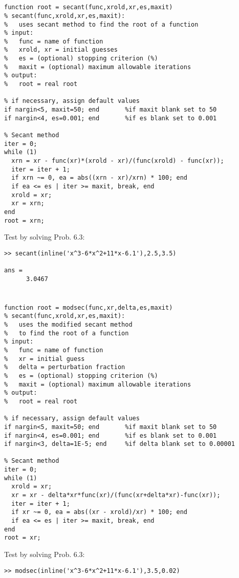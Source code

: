 \documentclass[../main.tex]{subfiles}
\begin{document}
\begin{enumerate}[label=\bfseries(\alph*)]
\section{}
\begin{lstlisting}[numbers=none]
function root = secant(func,xrold,xr,es,maxit)
% secant(func,xrold,xr,es,maxit):
%   uses secant method to find the root of a function
% input:
%   func = name of function
%   xrold, xr = initial guesses
%   es = (optional) stopping criterion (%)
%   maxit = (optional) maximum allowable iterations
% output:
%   root = real root

% if necessary, assign default values
if nargin<5, maxit=50; end 		 %if maxit blank set to 50
if nargin<4, es=0.001; end 		 %if es blank set to 0.001

% Secant method
iter = 0;
while (1)
  xrn = xr - func(xr)*(xrold - xr)/(func(xrold) - func(xr));
  iter = iter + 1;
  if xrn ~= 0, ea = abs((xrn - xr)/xrn) * 100; end
  if ea <= es | iter >= maxit, break, end
  xrold = xr;
  xr = xrn;
end
root = xrn;
\end{lstlisting}
\bigbreak
Test by solving Prob. 6.3:
\bigbreak
\begin{lstlisting}[numbers=none]
>> secant(inline('x^3-6*x^2+11*x-6.1'),2.5,3.5)

ans =
 	  3.0467
\end{lstlisting}
\bigbreak

\section{}
\begin{lstlisting}[numbers=none]
function root = modsec(func,xr,delta,es,maxit)
% secant(func,xrold,xr,es,maxit):
%   uses the modified secant method
%   to find the root of a function
% input:
%   func = name of function
%   xr = initial guess
%   delta = perturbation fraction
%   es = (optional) stopping criterion (%)
%   maxit = (optional) maximum allowable iterations
% output:
%   root = real root

% if necessary, assign default values
if nargin<5, maxit=50; end 		 %if maxit blank set to 50
if nargin<4, es=0.001; end 		 %if es blank set to 0.001
if nargin<3, delta=1E-5; end 	 %if delta blank set to 0.00001

% Secant method
iter = 0;
while (1)
  xrold = xr;
  xr = xr - delta*xr*func(xr)/(func(xr+delta*xr)-func(xr));
  iter = iter + 1;
  if xr ~= 0, ea = abs((xr - xrold)/xr) * 100; end
  if ea <= es | iter >= maxit, break, end
end
root = xr;
\end{lstlisting}
\bigbreak
Test by solving Prob. 6.3:
\bigbreak
\begin{lstlisting}[numbers=none]
>> modsec(inline('x^3-6*x^2+11*x-6.1'),3.5,0.02)


\end{lstlisting}
\end{enumerate}
\end{document}
